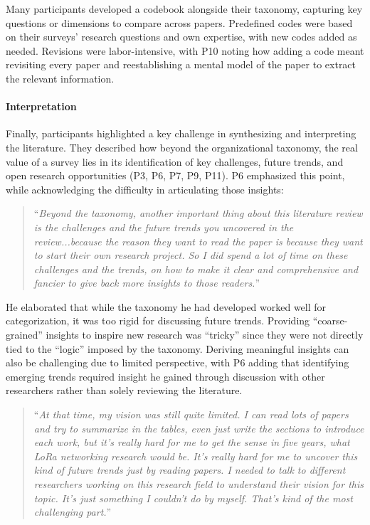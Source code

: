 Many participants developed a codebook alongside their taxonomy, capturing key questions or dimensions to compare across papers. Predefined codes were based on their surveys' research questions and own expertise, with new codes added as needed. Revisions were labor-intensive, with P10 noting how adding a code meant revisiting every paper and reestablishing a mental model of the paper to extract the relevant information.

\paragraph{\textbf{Interpretation}}
Finally, participants highlighted a key challenge in synthesizing and interpreting the literature. They described how beyond the organizational taxonomy, the real value of a survey lies in its identification of key challenges, future trends, and open research opportunities (P3, P6, P7, P9, P11). P6 emphasized this point, while acknowledging the difficulty in articulating those insights:
\begin{quote}
    ``\textit{Beyond the taxonomy, another important thing about this literature review is the challenges and the future trends you uncovered in the review...because the reason they want to read the paper is because they want to start their own research project. So I did spend a lot of time on these challenges and the trends, on how to make it clear and comprehensive and fancier to give back more insights to those readers.}''
\end{quote}
He elaborated that while the taxonomy he had developed worked well for categorization, it was too rigid for discussing future trends. Providing ``coarse-grained'' insights to inspire new research was ``tricky'' since they were not directly tied to the ``logic'' imposed by the taxonomy. Deriving meaningful insights can also be challenging due to limited perspective, with P6 adding that identifying emerging trends required insight he gained through discussion with other researchers rather than solely reviewing the literature.
\begin{quote}
    ``\textit{At that time, my vision was still quite limited. I can read lots of papers and try to summarize in the tables, even just write the sections to introduce each work, but it's really hard for me to get the sense in five years, what LoRa networking research would be. It's really hard for me to uncover this kind of future trends just by reading papers. I needed to talk to different researchers working on this research field to understand their vision for this topic. It's just something I couldn't do by myself. That's kind of the most challenging part.}''
\end{quote}

